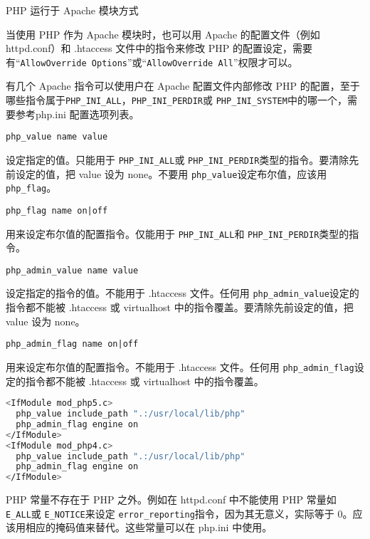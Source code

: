\begin{compactitem}
\item PHP 运行于 Apache 模块方式

当使用 PHP 作为 Apache 模块时，也可以用 Apache 的配置文件（例如 httpd.conf）和 .htaccess 文件中的指令来修改 PHP 的配置设定，需要有“\texttt{AllowOverride Options}”或“\texttt{AllowOverride All}”权限才可以。

有几个 Apache 指令可以使用户在 Apache 配置文件内部修改 PHP 的配置，至于哪些指令属于\texttt{PHP\_INI\_ALL}，\texttt{PHP\_INI\_PERDIR}或 \texttt{PHP\_INI\_SYSTEM}中的哪一个，需要参考php.ini 配置选项列表。

\begin{compactitem}
\item \texttt{php\_value name value}

设定指定的值。只能用于 \texttt{PHP\_INI\_ALL}或 \texttt{PHP\_INI\_PERDIR}类型的指令。要清除先前设定的值，把 value 设为 none。不要用 \texttt{php\_value}设定布尔值，应该用 \texttt{php\_flag}。

\item \texttt{php\_flag name on|off}

用来设定布尔值的配置指令。仅能用于 \texttt{PHP\_INI\_ALL}和 \texttt{PHP\_INI\_PERDIR}类型的指令。

\item \texttt{php\_admin\_value name value}

设定指定的指令的值。不能用于 .htaccess 文件。任何用 \texttt{php\_admin\_value}设定的指令都不能被 .htaccess 或 virtualhost 中的指令覆盖。要清除先前设定的值，把 value 设为 none。

\item \texttt{php\_admin\_flag name on|off}

用来设定布尔值的配置指令。不能用于 .htaccess 文件。任何用 \texttt{php\_admin\_flag}设定的指令都不能被 .htaccess 或 virtualhost 中的指令覆盖。
\end{compactitem}

\begin{lstlisting}[language=bash]
<IfModule mod_php5.c>
  php_value include_path ".:/usr/local/lib/php"
  php_admin_flag engine on
</IfModule>
<IfModule mod_php4.c>
  php_value include_path ".:/usr/local/lib/php"
  php_admin_flag engine on
</IfModule>
\end{lstlisting}

PHP 常量不存在于 PHP 之外。例如在 httpd.conf 中不能使用 PHP 常量如 \texttt{E\_ALL}或 \texttt{E\_NOTICE}来设定 \texttt{error\_reporting}指令，因为其无意义，实际等于 0。应该用相应的掩码值来替代。这些常量可以在 php.ini 中使用。


\end{compactitem}
